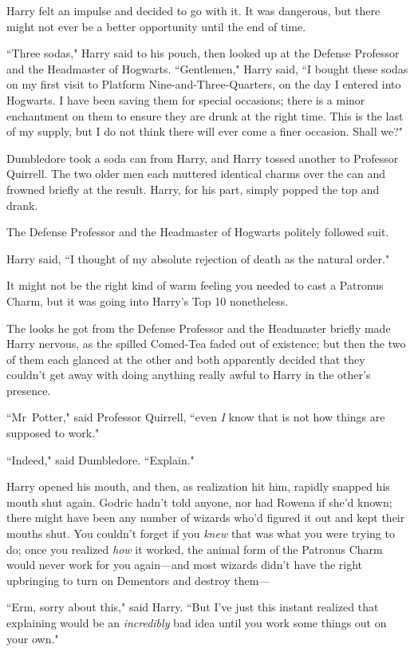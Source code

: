 Harry felt an impulse and decided to go with it. It was dangerous, but there might not ever be a better opportunity until the end of time.

``Three sodas," Harry said to his pouch, then looked up at the Defense Professor and the Headmaster of Hogwarts. ``Gentlemen," Harry said, ``I bought these sodas on my first visit to Platform Nine-and-Three-Quarters, on the day I entered into Hogwarts. I have been saving them for special occasions; there is a minor enchantment on them to ensure they are drunk at the right time. This is the last of my supply, but I do not think there will ever come a finer occasion. Shall we?"

Dumbledore took a soda can from Harry, and Harry tossed another to Professor Quirrell. The two older men each muttered identical charms over the can and frowned briefly at the result. Harry, for his part, simply popped the top and drank.

The Defense Professor and the Headmaster of Hogwarts politely followed suit.

Harry said, ``I thought of my absolute rejection of death as the natural order."

It might not be the right kind of warm feeling you needed to cast a Patronus Charm, but it was going into Harry's Top 10 nonetheless.

The looks he got from the Defense Professor and the Headmaster briefly made Harry nervous, as the spilled Comed-Tea faded out of existence; but then the two of them each glanced at the other and both apparently decided that they couldn't get away with doing anything really awful to Harry in the other's presence.

``Mr~Potter," said Professor Quirrell, ``even \emph{I} know that is not how things are supposed to work."

``Indeed," said Dumbledore. ``Explain."

Harry opened his mouth, and then, as realization hit him, rapidly snapped his mouth shut again. Godric hadn't told anyone, nor had Rowena if she'd known; there might have been any number of wizards who'd figured it out and kept their mouths shut. You couldn't forget if you \emph{knew} that was what you were trying to do; once you realized \emph{how} it worked, the animal form of the Patronus Charm would never work for you again—and most wizards didn't have the right upbringing to turn on Dementors and destroy them—

``Erm, sorry about this," said Harry. ``But I've just this instant realized that explaining would be an \emph{incredibly} bad idea until you work some things out on your own."


